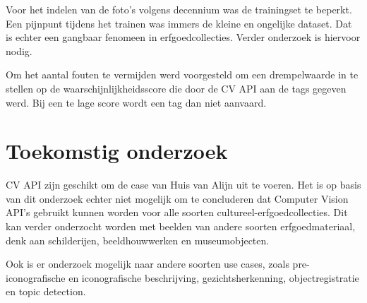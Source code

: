 \documentclass[a0,portrait]{a0poster}
\begin{document}
\begin{multicols}{2}
Voor het indelen van de foto's volgens decennium was de trainingset te beperkt. Een pijnpunt tijdens het trainen was immers de kleine en ongelijke dataset. Dat is echter een gangbaar fenomeen in erfgoedcollecties. Verder onderzoek is hiervoor nodig. 

Om het aantal fouten te vermijden werd voorgesteld om een drempelwaarde in te stellen op de waarschijnlijkheidsscore die door de CV API aan de tags gegeven werd. Bij een te lage score wordt een tag dan niet aanvaard.


\color{HoGentAccent1} 
\section*{Toekomstig onderzoek}
\color{black}

CV API zijn geschikt om de case van Huis van Alijn uit te voeren. Het is op basis van dit onderzoek echter niet mogelijk om te concluderen dat Computer Vision API's gebruikt kunnen worden voor alle soorten cultureel-erfgoedcollecties.  Dit kan verder onderzocht worden met beelden van andere soorten erfgoedmateriaal, denk aan schilderijen, beeldhouwwerken en museumobjecten.

Ook is er onderzoek mogelijk naar andere soorten use cases, zoals pre-iconografische en iconografische beschrijving, gezichtsherkenning, objectregistratie en topic detection.


\end{multicols}
\end{document}
